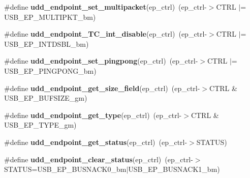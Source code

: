 \begin{DoxyCompactItemize}
\item 
\hypertarget{group__udd__xmega__usb__group_ga998292e605e48c1e39002f278ac3210a}{\#define {\bfseries udd\-\_\-endpoint\-\_\-set\-\_\-multipacket}(ep\-\_\-ctrl)~(ep\-\_\-ctrl-\/$>$C\-T\-R\-L $|$= U\-S\-B\-\_\-\-E\-P\-\_\-\-M\-U\-L\-T\-I\-P\-K\-T\-\_\-bm)}\label{group__udd__xmega__usb__group_ga998292e605e48c1e39002f278ac3210a}

\item 
\hypertarget{group__udd__xmega__usb__group_ga2a9c112f29af733fea9d60517b9f9968}{\#define {\bfseries udd\-\_\-endpoint\-\_\-\-T\-C\-\_\-int\-\_\-disable}(ep\-\_\-ctrl)~(ep\-\_\-ctrl-\/$>$C\-T\-R\-L $|$= U\-S\-B\-\_\-\-E\-P\-\_\-\-I\-N\-T\-D\-S\-B\-L\-\_\-bm)}\label{group__udd__xmega__usb__group_ga2a9c112f29af733fea9d60517b9f9968}

\item 
\hypertarget{group__udd__xmega__usb__group_ga54aefdab9dc21e871cc51703c937bf86}{\#define {\bfseries udd\-\_\-endpoint\-\_\-set\-\_\-pingpong}(ep\-\_\-ctrl)~(ep\-\_\-ctrl-\/$>$C\-T\-R\-L $|$= U\-S\-B\-\_\-\-E\-P\-\_\-\-P\-I\-N\-G\-P\-O\-N\-G\-\_\-bm)}\label{group__udd__xmega__usb__group_ga54aefdab9dc21e871cc51703c937bf86}

\item 
\hypertarget{group__udd__xmega__usb__group_gac4c3b0418c8acb7c0813a43814aabe75}{\#define {\bfseries udd\-\_\-endpoint\-\_\-get\-\_\-size\-\_\-field}(ep\-\_\-ctrl)~(ep\-\_\-ctrl-\/$>$C\-T\-R\-L \& U\-S\-B\-\_\-\-E\-P\-\_\-\-B\-U\-F\-S\-I\-Z\-E\-\_\-gm)}\label{group__udd__xmega__usb__group_gac4c3b0418c8acb7c0813a43814aabe75}

\item 
\hypertarget{group__udd__xmega__usb__group_ga628f72699e2bff59c50bbe7b8a459068}{\#define {\bfseries udd\-\_\-endpoint\-\_\-get\-\_\-type}(ep\-\_\-ctrl)~(ep\-\_\-ctrl-\/$>$C\-T\-R\-L \& U\-S\-B\-\_\-\-E\-P\-\_\-\-T\-Y\-P\-E\-\_\-gm)}\label{group__udd__xmega__usb__group_ga628f72699e2bff59c50bbe7b8a459068}

\item 
\hypertarget{group__udd__xmega__usb__group_ga147160f6d653e9244f4cee044b62ff39}{\#define {\bfseries udd\-\_\-endpoint\-\_\-get\-\_\-status}(ep\-\_\-ctrl)~(ep\-\_\-ctrl-\/$>$S\-T\-A\-T\-U\-S)}\label{group__udd__xmega__usb__group_ga147160f6d653e9244f4cee044b62ff39}

\item 
\hypertarget{group__udd__xmega__usb__group_ga95e7bb565e2b9a87ba1741a91cbf2314}{\#define {\bfseries udd\-\_\-endpoint\-\_\-clear\-\_\-status}(ep\-\_\-ctrl)~(ep\-\_\-ctrl-\/$>$S\-T\-A\-T\-U\-S=U\-S\-B\-\_\-\-E\-P\-\_\-\-B\-U\-S\-N\-A\-C\-K0\-\_\-bm$|$U\-S\-B\-\_\-\-E\-P\-\_\-\-B\-U\-S\-N\-A\-C\-K1\-\_\-bm)}\label{group__udd__xmega__usb__group_ga95e7bb565e2b9a87ba1741a91cbf2314}


\end{DoxyCompactItemize}
